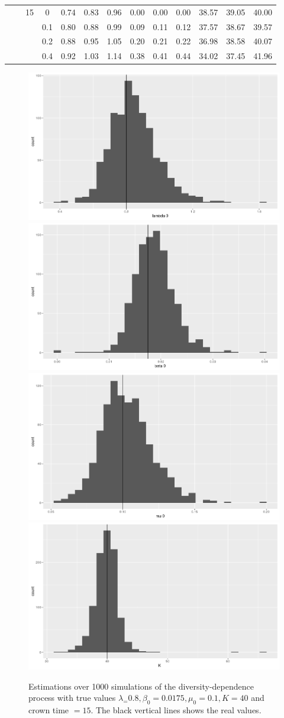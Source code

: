 \documentclass[11pt]{beamer}
\begin{document}
\begin{frame}
\begin{table}[h!]
{\begin{tabular}{cccc|ccc@{\hskip 0.2in}ccc@{\hskip 0.2in}ccc}
           &       & 15           & 0      & 0.74    & 0.83  & 0.96  & 0.00   & 0.00  & 0.00  & 38.57 & 39.05 & 40.00 \\
           &       &              & 0.1    & 0.80    & 0.88  & 0.99  & 0.09   & 0.11  & 0.12  & 37.57 & 38.67 & 39.57 \\
           &       &              & 0.2    & 0.88    & 0.95  & 1.05  & 0.20   & 0.21  & 0.22  & 36.98 & 38.58 & 40.07 \\
           &       &              & 0.4    & 0.92    & 1.03  & 1.14  & 0.38   & 0.41  & 0.44  & 34.02 & 37.45 & 41.96
\end{tabular}
}
\end{table}



\end{frame}

\begin{frame}
 \begin{figure}[h]
\includegraphics[width=.35\textwidth]{lambda.png}
\includegraphics[width=.35\textwidth]{beta.png}\\
\includegraphics[width=.35\textwidth]{mu.png}
\includegraphics[width=.35\textwidth]{K.png}
\label{hists}
\caption{Estimations over 1000 simulations of the diversity-dependence process with true values $\lambda_ = 0.8, \beta_0 = 0.0175, \mu_0 = 0.1, K=40$ and crown time $=15$. The black vertical lines shows the real values.}
\end{figure}
\end{frame}
\end{document}
